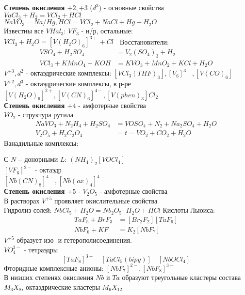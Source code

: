 \textbf{Степень окисления $+2, +3$} ($d^3$) - основные свойства \\
$VaCl_3  + H_2 = VCl_2 + HCl$ \\
$NaVO_3 = Na/Hg, HCl = VCl_2 + NaCl + Hg + H_2O$ \\
Известны все $VHal_3$: $VF_3$ - н/р, остальные: $VCl_3 + H_2O = \left[V(H_2O)_6 \right]^{3+} + Cl^-  $ 
Восстановители:
\begin{align*}
VSO_4 + H_2SO_4 &= V_2(SO_4)_3 + H_2 \\	
VCl_3 + KMnO_4 + KOH &= KVO_3 + MnO_2 + KCl + H_2O 
\end{align*}
$V^{+3}, d^2$ - октаэдрические комплексы: $ \left[VCl_3(THF)_3 \right], \left[V_6 \right]^{3-}, \left[V(CO)_6 \right] $ \\
$V^{+2}, d^3$ - октаэдрические комплексы, в р-ре $ \left[V(H_2O)_6 \right]^{2+}, \left[V(CN)_6 \right]^{4-}, \left[V(phen)_3 \right]Cl_2 $ \\
\textbf{Степень окисления $+4$} - амфотерные свойства \\
$VO_2$ - структура рутила
\begin{align*}
NaVO_3 + N_2H_4 + H_2SO_4 &= VOSO_4 + N_2 + Na_2SO_4 + H_2O \\
V_2O_5 + H_2C_2O_4 &= t = VO_2 + CO_2 + H_2O
\end{align*}
Ванадильные комплексы:
\begin{figure} [H]
	\centering {\texttt{[image: ee1]}}
\end{figure}
С $N-$донорными $L$: $(NH_4)_2\left[VOCl_4 \right]$ \\
$\left[VF_6 \right]^{2-}$ - октаэдр \\
$ 	\left[Nb(CN)_8 \right]^{4-}, \left[Nb(ox)_4 \right]^{4-} $ \\
\textbf{Степень окисления $+5$} - $V_2O_5$ - амфотерные свойства \\
В растворах $V^{+5}$ проявляет окислительные свойства \\
Гидролиз солей: $ NbCl_5 + H_2O = Nb_2O_5 \cdot H_2O + HCl $
Кислоты Льюиса: 
\begin{align*}
TaF_5 + BrF_3 &= \left[Br_2F_2 \right]\left[TaF_6 \right] \\
NbF_6 + KF &=   K_2\left[NbF_7 \right]
\end{align*}
$V^{+5}$ образует изо- и гетерополисоединения. \\
$VO_4^{3-}$ - тетраэдры \\
\[
\left[TaF_8 \right]^{3-} \quad \left[TaCl_5(bipy) \right] \quad \left[NbOCl_4 \right]
\] 
Фторидные комплексные анионы: $ \left[NbF_7 \right]^{2-}, \left[NbF_8 \right]^{3-} $ \\
В низших степенях окисления $Nb$ и $Ta$ образуют треугольные кластеры состава $M_3X_8$, октаэдрические кластеры $M_6X_{12}$
